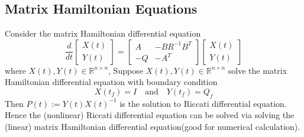 \documentclass[10pt,a4paper,oneside]{article}
\begin{document}
\subsection{Matrix Hamiltonian Equations}
Consider the matrix Hamiltonian differential equation
$$
\frac{d}{d t}\left[\begin{array}{l}{X(t)} \\ {Y(t)}\end{array}\right]=\left[\begin{array}{cc}{A} & {-B R^{-1} B^{T}} \\ {-Q} & {-A^{T}}\end{array}\right]\left[\begin{array}{l}{X(t)} \\ {Y(t)}\end{array}\right]
$$
where $X(t),Y(t)\in\mathbb{R}^{n\times n}$, Suppose $X(t),Y(t)\in\mathbb{R}^{n\times n}$ solve the matrix Hamiltonian differential equation with boundary condition 
\[
X(t_f)=I \quad \text{and} \quad Y(t_f)=Q_f
\] 
Then $P(t) :=Y(t) X(t)^{-1}$ is the solution to Riccati differential equation. Hence the (nonlinear) Riccati differential equation can be solved via solving the (linear) matrix Hamiltonian differential equation(good for numerical calculation).
\end{document}
